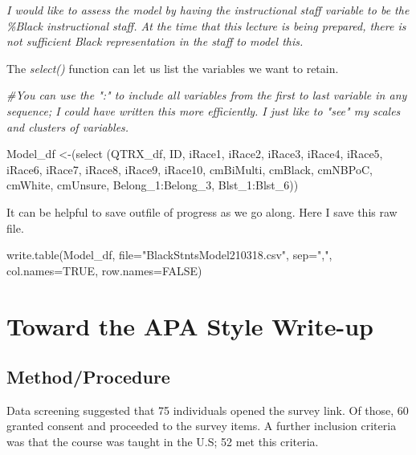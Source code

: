 \documentclass[
]{book}
\newenvironment{Shaded}{\begin{snugshade}}{\end{snugshade}}
\newcommand{\AttributeTok}[1]{\textcolor[rgb]{0.77,0.63,0.00}{#1}}
\newcommand{\CommentTok}[1]{\textcolor[rgb]{0.56,0.35,0.01}{\textit{#1}}}
\newcommand{\ConstantTok}[1]{\textcolor[rgb]{0.00,0.00,0.00}{#1}}
\newcommand{\FunctionTok}[1]{\textcolor[rgb]{0.00,0.00,0.00}{#1}}
\newcommand{\NormalTok}[1]{#1}
\newcommand{\OtherTok}[1]{\textcolor[rgb]{0.56,0.35,0.01}{#1}}
\newcommand{\SpecialCharTok}[1]{\textcolor[rgb]{0.00,0.00,0.00}{#1}}
\newcommand{\StringTok}[1]{\textcolor[rgb]{0.31,0.60,0.02}{#1}}
\begin{document}
\emph{I would like to assess the model by having the instructional staff variable to be the \%Black instructional staff. At the time that this lecture is being prepared, there is not sufficient Black representation in the staff to model this.}

The \emph{select()} function can let us list the variables we want to retain.

\begin{Shaded}
\begin{Highlighting}[]
\CommentTok{\#You can use the ":" to include all variables from the first to last variable in any sequence; I could have written this more efficiently.  I just like to "see" my scales and clusters of variables.}

\NormalTok{Model\_df }\OtherTok{\textless{}{-}}\NormalTok{(}\FunctionTok{select}\NormalTok{ (QTRX\_df, ID, iRace1, iRace2, iRace3, iRace4, iRace5, iRace6, iRace7, iRace8, iRace9, iRace10, cmBiMulti, cmBlack, cmNBPoC, cmWhite, cmUnsure, Belong\_1}\SpecialCharTok{:}\NormalTok{Belong\_3, Blst\_1}\SpecialCharTok{:}\NormalTok{Blst\_6))}
\end{Highlighting}
\end{Shaded}

It can be helpful to save outfile of progress as we go along. Here I save this raw file.

\begin{Shaded}
\begin{Highlighting}[]
\FunctionTok{write.table}\NormalTok{(Model\_df, }\AttributeTok{file=}\StringTok{"BlackStntsModel210318.csv"}\NormalTok{, }\AttributeTok{sep=}\StringTok{","}\NormalTok{, }\AttributeTok{col.names=}\ConstantTok{TRUE}\NormalTok{, }\AttributeTok{row.names=}\ConstantTok{FALSE}\NormalTok{)}
\end{Highlighting}
\end{Shaded}

\hypertarget{toward-the-apa-style-write-up}{%
\section{Toward the APA Style Write-up}\label{toward-the-apa-style-write-up}}

\hypertarget{methodprocedure}{%
\subsection{Method/Procedure}\label{methodprocedure}}

Data screening suggested that 75 individuals opened the survey link. Of those, 60 granted consent and proceeded to the survey items. A further inclusion criteria was that the course was taught in the U.S; 52 met this criteria.
\end{document}
